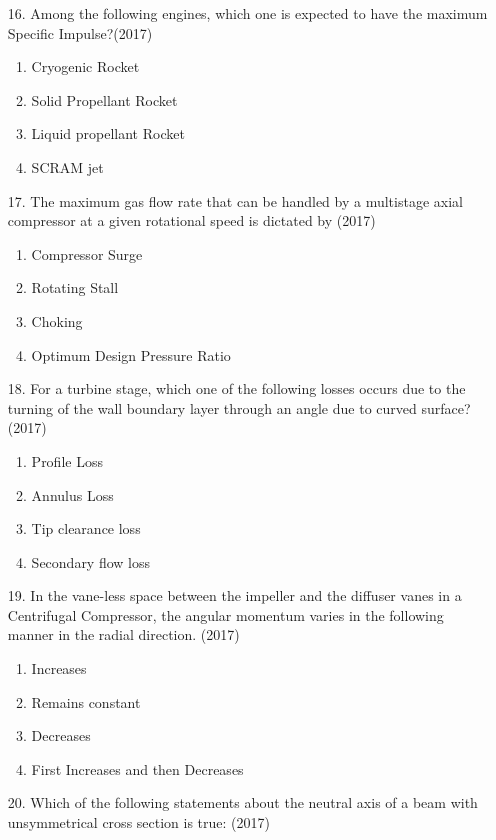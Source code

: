 \documentclass[journal]{IEEEtran}
\begin{document}
\begin{enumerate}
    \item[16.] Among the following engines, which one is expected to have the maximum Specific Impulse?\hfill (2017)
    \begin{enumerate}[label=(\Alph*)]
        \item Cryogenic Rocket
        \item Solid Propellant Rocket
        \item Liquid propellant Rocket
        \item SCRAM jet
    \end{enumerate}
    \item[17.] The maximum gas flow rate that can be handled by a multistage axial compressor at a given rotational speed is dictated by \hfill (2017)
    \begin{enumerate}[label=(\Alph*)]
        \item Compressor Surge
        \item Rotating Stall
        \item Choking
        \item Optimum Design Pressure Ratio 
    \end{enumerate}
    \item[18.] For a turbine stage, which one of the following losses occurs due to the turning of the wall boundary layer through an angle due to curved surface? \hfill (2017)
    \begin{enumerate}[label=(\Alph*)]
        \item Profile Loss 
        \item Annulus Loss 
        \item Tip clearance loss 
        \item Secondary flow loss 
    \end{enumerate}
    \item[19.] In the vane-less space between the impeller and the diffuser vanes in a Centrifugal Compressor, the angular momentum varies in the following manner in the radial direction. \hfill (2017)
    \begin{enumerate}[label=(\Alph*)]
        \item Increases
        \item Remains constant
        \item Decreases
        \item First Increases and then Decreases
    \end{enumerate}
    \item[20.] Which of the following statements about the neutral axis of a beam with unsymmetrical cross section is true: \hfill (2017)

\end{enumerate}
\end{document}
